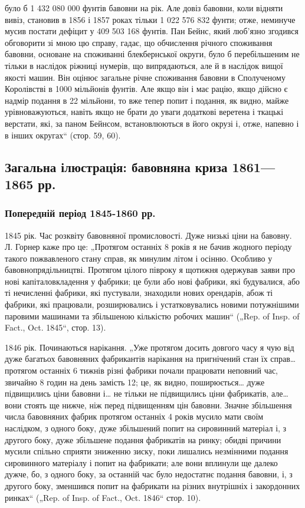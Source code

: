 \parcont{}  %
було б 1 432 080 000 фунтів бавовни на рік. Але довіз бавовни,
коли відняти вивіз, становив в 1856 і 1857 роках тільки
1 022 576 832 фунти; отже, неминуче мусив постати дефіцит
у 409 503 168 фунтів. Пан Бейнс, який люб’язно згодився обговорити
зі мною цю справу, гадає, що обчислення річного споживання
бавовни, основане на споживанні блекбернської округи,
було б перебільшеним не тільки в наслідок ріжниці нумерів, що
випрядаються, але й в наслідок вищої якості машин. Він оцінює загальне
річне споживання бавовни в Сполученому Королівстві в
1000 мільйонів фунтів. Але якщо він і має рацію, якщо дійсно
є надмір подання в 22  мільйони, то вже тепер попит і подання,
як видно, майже урівноважуються, навіть якщо не брати до
уваги додаткові веретена і ткацькі верстати, які, за паном
Бейнсом, встановлюються в його окрузі і, отже, напевно і
в інших округах“ (стор. 59, 60).

\subsection{Загальна ілюстрація: бавовняна криза 1861—1865 рр.}

\subsubsection{Попередній період 1845-1860 рр.}

1845 рік. Час розквіту бавовняної промисловості. Дуже низькі
ціни на бавовну. Л. Горнер каже про це: „Протягом останніх
8 років я не бачив жодного періоду такого пожвавленого стану
справ, як минулим літом і осінню. Особливо у бавовнопрядільництві.
Протягом цілого півроку я щотижня одержував заяви
про нові капіталовкладення у фабрики; це були або нові фабрики,
які будувалися, або ті нечисленні фабрики, які пустували, знаходили
нових орендарів, абож ті фабрики, які працювали, розширювались
і устатковувались новими потужнішими паровими машинами
та збільшеною кількістю робочих машин“ („Rep. of Insp.
of Fact., Oct. 1845“, стор. 13).

1846 рік. Починаються нарікання. „Уже протягом досить довгого
часу я чую від дуже багатьох бавовняних фабрикантів нарікання
на пригнічений стан їх справ\dots{} протягом останніх 6 тижнів
різні фабрики почали працювати неповний час, звичайно
8 годин на день замість 12; це, як видно, поширюється\dots{} дуже
підвищились ціни бавовни і\dots{} не тільки не підвищились ціни
фабрикатів, але\dots{} вони стоять ще нижче, ніж перед підвищенням
цін бавовни. Значне збільшення числа бавовняних фабрик
протягом останніх 4 років мусило мати своїм наслідком,
з одного боку, дуже збільшений попит на сировинний матеріал
і, з другого боку, дуже збільшене подання фабрикатів на ринку;
обидві причини мусили спільно сприяти зниженню зиску, поки
лишались незмінними подання сировинного матеріалу і попит
на фабрикати; але вони вплинули ще далеко дужче, бо, з одного
боку, за останній час було недостатнє подання бавовни,
і, з другого боку, зменшився попит на фабрикати на різних
внутрішніх і закордонних ринках“ („Rep. of Insp. of Fact., Oct.
1846“ стор. 10).
